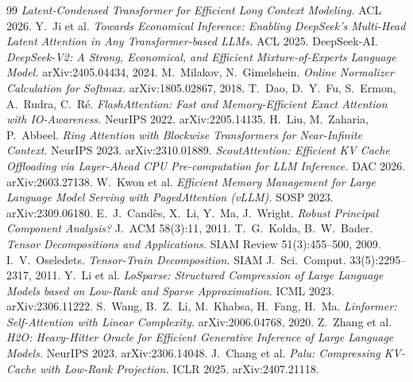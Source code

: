 \documentclass[11pt]{article}
\begin{document}
\begin{thebibliography}{99}
 \emph{Latent-Condensed Transformer for Efficient Long Context Modeling.} ACL 2026.
 Y.~Ji et al. \emph{Towards Economical Inference: Enabling DeepSeek's Multi-Head Latent Attention in Any Transformer-based LLMs.} ACL 2025.
 DeepSeek-AI. \emph{DeepSeek-V2: A Strong, Economical, and Efficient Mixture-of-Experts Language Model.} arXiv:2405.04434, 2024.
 M.~Milakov, N.~Gimelshein. \emph{Online Normalizer Calculation for Softmax.} arXiv:1805.02867, 2018.
 T.~Dao, D.~Y.~Fu, S.~Ermon, A.~Rudra, C.~R\'e. \emph{FlashAttention: Fast and Memory-Efficient Exact Attention with IO-Awareness.} NeurIPS 2022. arXiv:2205.14135.
 H.~Liu, M.~Zaharia, P.~Abbeel. \emph{Ring Attention with Blockwise Transformers for Near-Infinite Context.} NeurIPS 2023. arXiv:2310.01889.
 \emph{ScoutAttention: Efficient KV Cache Offloading via Layer-Ahead CPU Pre-computation for LLM Inference.} DAC 2026. arXiv:2603.27138.
 W.~Kwon et al. \emph{Efficient Memory Management for Large Language Model Serving with PagedAttention (vLLM).} SOSP 2023. arXiv:2309.06180.
 E.~J.~Cand\`es, X.~Li, Y.~Ma, J.~Wright. \emph{Robust Principal Component Analysis?} J.~ACM 58(3):11, 2011.
 T.~G.~Kolda, B.~W.~Bader. \emph{Tensor Decompositions and Applications.} SIAM Review 51(3):455--500, 2009.
 I.~V.~Oseledets. \emph{Tensor-Train Decomposition.} SIAM J.~Sci.~Comput. 33(5):2295--2317, 2011.
 Y.~Li et al. \emph{LoSparse: Structured Compression of Large Language Models based on Low-Rank and Sparse Approximation.} ICML 2023. arXiv:2306.11222.
 S.~Wang, B.~Z.~Li, M.~Khabsa, H.~Fang, H.~Ma. \emph{Linformer: Self-Attention with Linear Complexity.} arXiv:2006.04768, 2020.
 Z.~Zhang et al. \emph{H2O: Heavy-Hitter Oracle for Efficient Generative Inference of Large Language Models.} NeurIPS 2023. arXiv:2306.14048.
 J.~Chang et al. \emph{Palu: Compressing KV-Cache with Low-Rank Projection.} ICLR 2025. arXiv:2407.21118.
\end{thebibliography}
\end{document}
